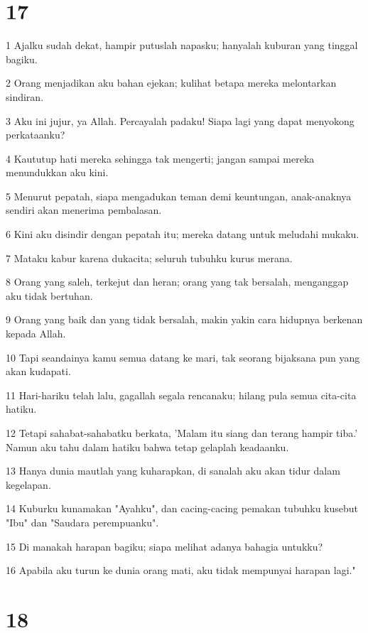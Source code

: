 \chapter{17}

\par 1 Ajalku sudah dekat, hampir putuslah napasku; hanyalah kuburan yang tinggal bagiku.
\par 2 Orang menjadikan aku bahan ejekan; kulihat betapa mereka melontarkan sindiran.
\par 3 Aku ini jujur, ya Allah. Percayalah padaku! Siapa lagi yang dapat menyokong perkataanku?
\par 4 Kaututup hati mereka sehingga tak mengerti; jangan sampai mereka menundukkan aku kini.
\par 5 Menurut pepatah, siapa mengadukan teman demi keuntungan, anak-anaknya sendiri akan menerima pembalasan.
\par 6 Kini aku disindir dengan pepatah itu; mereka datang untuk meludahi mukaku.
\par 7 Mataku kabur karena dukacita; seluruh tubuhku kurus merana.
\par 8 Orang yang saleh, terkejut dan heran; orang yang tak bersalah, menganggap aku tidak bertuhan.
\par 9 Orang yang baik dan yang tidak bersalah, makin yakin cara hidupnya berkenan kepada Allah.
\par 10 Tapi seandainya kamu semua datang ke mari, tak seorang bijaksana pun yang akan kudapati.
\par 11 Hari-hariku telah lalu, gagallah segala rencanaku; hilang pula semua cita-cita hatiku.
\par 12 Tetapi sahabat-sahabatku berkata, 'Malam itu siang dan terang hampir tiba.' Namun aku tahu dalam hatiku bahwa tetap gelaplah keadaanku.
\par 13 Hanya dunia mautlah yang kuharapkan, di sanalah aku akan tidur dalam kegelapan.
\par 14 Kuburku kunamakan "Ayahku", dan cacing-cacing pemakan tubuhku kusebut "Ibu" dan "Saudara perempuanku".
\par 15 Di manakah harapan bagiku; siapa melihat adanya bahagia untukku?
\par 16 Apabila aku turun ke dunia orang mati, aku tidak mempunyai harapan lagi."

\chapter{18}

